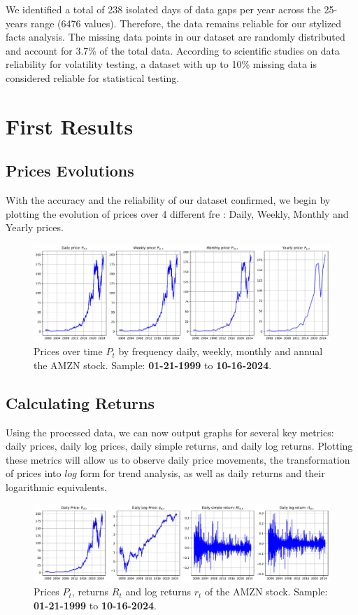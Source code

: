 \documentclass{article}
\begin{document}
\noindent We identified a total of 238 isolated days of data gaps per year across the 25-years range (6476 values). 
Therefore, the data remains reliable for our stylized facts analysis. 
The missing data points in our dataset are randomly distributed and account for 3.7\% of the total data. 
According to scientific studies on data reliability for volatility testing, a dataset with up to 10\% missing data is considered reliable for statistical testing.
\cite{pumi2023longrange} 

\section{First Results}

\subsection{Prices Evolutions}

With the accuracy and the reliability of our dataset confirmed, we begin by plotting the evolution of prices over 4 different fre : Daily, Weekly, Monthly and Yearly prices.

\begin{figure}[H]
    \centering
    \includegraphics[width=\textwidth]{Img/prices_time.pdf}
    \caption{Prices over time $P_t$  by frequency daily, weekly, monthly and annual the AMZN stock.
    Sample: \textbf{01-21-1999} to \textbf{10-16-2024}.}
    \label{fig:prices_time}
\end{figure}

\subsection{Calculating Returns}
Using the processed data, we can now output graphs for several key metrics: 
daily prices, daily log prices, daily simple returns, and daily log returns. 
Plotting these metrics will allow us to observe daily price movements, 
the transformation of prices into $log$ form for trend analysis, 
as well as daily returns and their logarithmic equivalents.
\begin{figure}[H]
    \centering
    \includegraphics[width=\textwidth]{Img/log_returns.pdf}
    \caption{Prices $P_t$, returns $R_t$ and log returns $r_t$ of the AMZN stock.
    Sample: \textbf{01-21-1999} to \textbf{10-16-2024}.}
    \label{fig:log_returns}
\end{figure}
\end{document}
